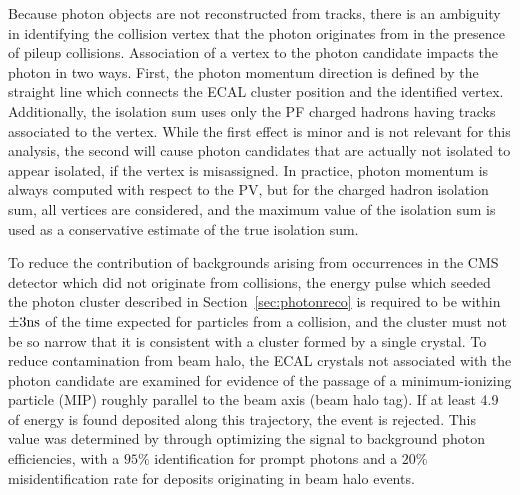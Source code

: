 
Because photon objects are not reconstructed from tracks,
 there is an ambiguity in identifying the collision
 vertex that the photon originates from in the presence 
 of pileup collisions.
Association of a vertex to the photon candidate impacts the photon in two ways. 
First, the photon momentum direction is defined by the
 straight line which connects
 the ECAL cluster position and the identified vertex. 
Additionally, the isolation sum 
 uses only the PF charged hadrons
 having tracks
 associated to the vertex. 
While the first effect is minor and is
 not relevant for this analysis, the second will cause photon
 candidates that are actually not isolated to appear
 isolated, if the 
 vertex is misassigned.  
In practice, photon momentum is always
 computed with respect to the PV,
 but for the charged hadron isolation sum,
 all vertices are considered, and the 
 maximum value of the isolation sum is used as a conservative estimate
 of the true isolation sum.

To reduce the contribution of backgrounds arising from 
 occurrences in the CMS detector which did not originate from
 collisions, the energy pulse which seeded the photon cluster
 described in Section~\ref{sec:photonreco}
 is required to be within $\pm 3\mathrm{ns}$ of the time expected
 for particles from a collision, and the cluster must not
 be so narrow that it is consistent with a cluster formed by a single crystal.  
To reduce contamination from beam halo, the ECAL
 crystals not  associated with the photon candidate are 
 examined for evidence of the passage of a minimum-ionizing
 particle (MIP) roughly parallel to the beam axis (beam halo tag).
If at least  4.9 \GeV of energy is found deposited along
 this trajectory, the event is rejected.
This value was determined by through optimizing the
 signal to background photon efficiencies, with
 a $95\%$ identification for prompt photons and
 a $20\%$ misidentification rate for deposits originating
 in beam halo events.


